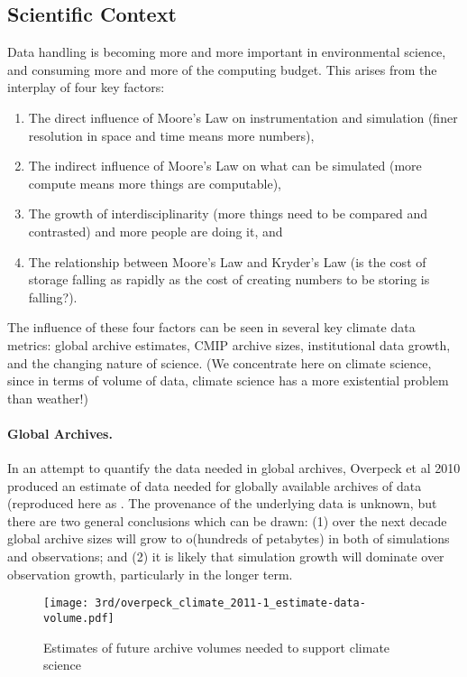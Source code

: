 
\subsection{Scientific Context}
\label{sec:scientific context}

Data handling is becoming more and more important in environmental science, and consuming more and more of the computing budget.
This arises from the interplay of four key factors:
\begin{enumerate}
\item The direct influence of Moore's Law on instrumentation and simulation (finer resolution in space and time means more numbers),
\item The indirect influence of Moore's Law on what can be simulated (more compute means more things are computable),
\item The growth of interdisciplinarity (more things need to be compared and contrasted) and more people are doing it, and
\item The relationship between Moore's Law and Kryder's Law (is the cost of storage falling as rapidly as the cost of creating numbers to be storing is falling?).
\end{enumerate}

The influence of these four factors can be seen in several key climate data metrics: global archive estimates, CMIP archive sizes, institutional data growth, and the changing nature of science. (We concentrate here on climate science, since in terms of volume of data, climate science has a more existential problem than weather!)

\paragraph{Global Archives.}

In an attempt to quantify the data needed in global archives, Overpeck et al 2010 produced an estimate of data needed for globally available archives of data (reproduced here as .
The provenance of the underlying data is unknown, but there are two general conclusions which can be drawn: (1) over the next decade global archive sizes will grow to o(hundreds of petabytes) in both of simulations and observations; and (2) it is likely that simulation growth will dominate over observation growth, particularly in the longer term.

\begin{figure}[h]
	\centering
	\texttt{[image: 3rd/overpeck\_climate\_2011-1\_estimate-data-volume.pdf]}
	\caption{Estimates of future archive volumes needed to support climate science \cite{overpeck_climate_2011}}
	\label{fig:data prediction climate}
\end{figure}

